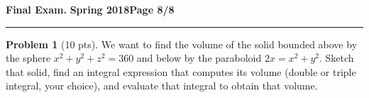 \documentclass[12pt]{article}
\theoremstyle{definition}
\newtheorem{problem}{Problem}
\begin{document}
\hfill{\large\bf Final Exam.}\hfill{\large\bf
  Spring 2018}\hfill{\large\bf Page 8/8}\hrule

\bigskip
\begin{problem}[10 pts]
We want to find the volume of the solid bounded above by the sphere $x^2+y^2+z^2=360$ and below by the paraboloid $2x = x^2+y^2$. Sketch that solid, find an integral expression that computes its volume (double or triple integral, your choice), and evaluate that integral to obtain that volume.
\vspace{19cm}
\begin{flushright}
\end{flushright}
\end{problem}
\end{document}
